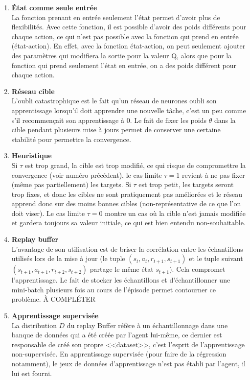 \documentclass[letterpaper,11pt]{article}
\begin{document}
\begin{enumerate}[label=(\alph*)]

\item \textbf{État comme seule entrée}\\
La fonction prenant en entrée seulement l'état permet d'avoir plus de flexibilités.
Avec cette fonction, il est possible d'avoir des poids différents pour chaque action, ce qui n'est pas possible avec la fonction qui prend en entrée (état-action). En effet, avec la fonction état-action, on peut seulement ajouter des paramètres qui modifiera la sortie pour la valeur Q, alors que pour la fonction qui prend seulement l'état en entrée, on a des poids différent pour chaque action.

\item \textbf{Réseau cible}\\
L'oubli catastrophique est le fait qu'un réseau de neurones oubli son apprentissage lorsqu'il doit apprendre une nouvelle tâche, c'est un peu comme s'il recommençait son apprentissage à 0. Le fait de fixer les poids $\theta$ dans la cible pendant plusieurs mise à jours permet de conserver une certaine stabilité pour permettre la convergence.

\item \textbf{Heuristique}\\
Si $\tau$ est trop grand, la cible est trop modifié, ce qui risque de compromettre la convergence (voir numéro précédent), le cas limite $\tau=1$ revient à ne pas fixer (même pas partiellement) les targets. Si $\tau$ est trop petit, les targets seront trop fixes, et donc les cibles ne sont pratiquement pas améliorées et le réseau apprend donc sur des moins bonnes cibles (non-représentative de ce que l'on doit viser). Le cas limite $\tau=0$ montre un cas où la cible n'est jamais modifiée et gardera toujours sa valeur initiale, ce qui est bien entendu non-souhaitable. 

\item \textbf{Replay buffer}\\
L'avantage de son utilisation est de briser la corrélation entre les échantillons utilisés lors de la mise à jour (le tuple $(s_t, a_t, r_{t+1}, s_{t+1})$ et le tuple suivant $(s_{t+1}, a_{t+1}, r_{t+2}, s_{t+2})$ partage le même état $s_{t+1}$). Cela compromet l'apprentissage. Le fait de stocker les échantillons et d'échantillonner une mini-batch plusieurs fois au cours de l'épisode permet contourner ce problème. À COMPLÉTER  

\item \textbf{Apprentissage supervisée}\\
La distribution $D$ du replay Buffer réfère à un échantillonnage dans une banque de données qui a été créée par l'agent lui-même, ce dernier est responsable de créé son propre <<dataset>>, c'est l'esprit de l'apprentissage non-supervisée. En apprentissage supervisée (pour faire de la régression notamment), le jeux de données d'apprentissage n'est pas établi par l'agent, il lui est fourni. 


\end{enumerate}
\end{document}
